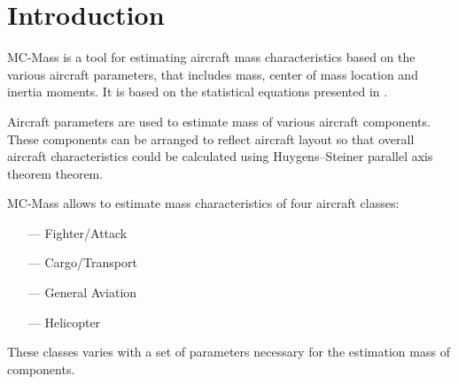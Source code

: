 \chapter{Introduction}

MC-Mass is a tool for estimating aircraft mass characteristics based on the various aircraft parameters, that includes mass, center of mass location and inertia moments. It is based on the statistical equations presented in \cite{Raymer2018,NASA-TP-2015-218751}.

Aircraft parameters are used to estimate mass of various aircraft components. These components can be arranged to reflect aircraft layout so that overall aircraft characteristics could be calculated using Huygens–Steiner parallel axis theorem theorem.

MC-Mass allows to estimate mass characteristics of four aircraft classes:
\begin{itemize}
  \item[---] Fighter/Attack
  \item[---] Cargo/Transport
  \item[---] General Aviation
  \item[---] Helicopter
\end{itemize}

These classes varies with a set of parameters necessary for the estimation mass of components.
